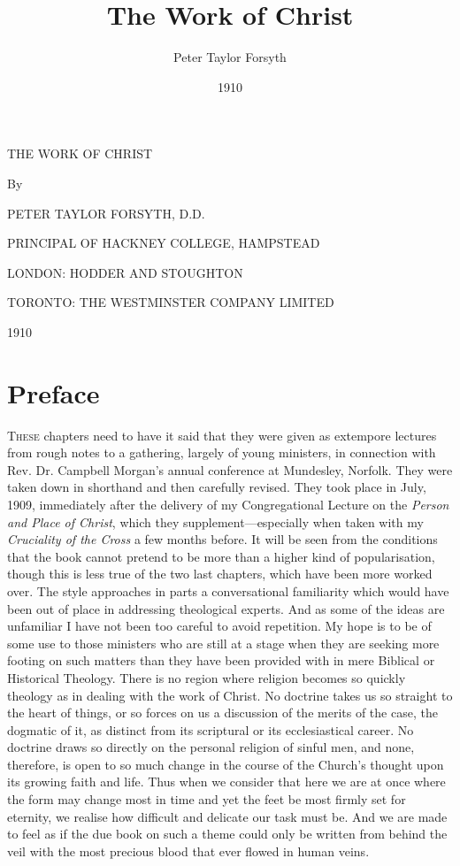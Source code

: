 \documentclass[draft]{ptfdoc}
\author{Peter Taylor Forsyth}
\title{The Work of Christ}
\date{1910}
\begin{document}
\frontmatter

\begin{titlepage}
\centering
{\LARGE THE WORK OF CHRIST \par}
\vspace{2in}
By \\
{\large PETER TAYLOR FORSYTH, D.D. \par}
{\footnotesize PRINCIPAL OF HACKNEY COLLEGE, HAMPSTEAD \par}
\vfill
{\small LONDON: HODDER AND STOUGHTON \par}
{\small TORONTO: THE WESTMINSTER COMPANY LIMITED \par}
1910
\end{titlepage}


\chapter{Preface} 

\textsc{These} chapters need to have it said that 
they were given as extempore lectures 
from rough notes to a gathering, largely of 
young ministers, in connection with Rev. 
Dr. Campbell Morgan's annual conference at 
Mundesley, Norfolk. They were taken down 
in shorthand and then carefully revised. They 
took place in July, 1909, immediately after 
the delivery of my Congregational Lecture on 
the \textit{Person and Place of Christ}, which they 
supplement---especially when taken with my 
\textit{Cruciality of the Cross} a few months before. 
It will be seen from the conditions that the 
book cannot pretend to be more than a 
higher kind of popularisation, though this is 
less true of the two last chapters, which 
have been more worked over. The style approaches 
in parts a conversational familiarity 
which would have been out of place in addressing 
theological experts. And as some of the 
ideas are unfamiliar I have not been too careful 
to avoid repetition. My hope is to be of some 
use to those ministers who are still at a 
stage when they are seeking more footing on 
such matters than they have been provided 
with in mere Biblical or Historical Theology. 
There is no region where religion becomes so 
quickly theology as in dealing with the work 
of Christ. No doctrine takes us so straight 
to the heart of things, or so forces on us a 
discussion of the merits of the case, the dogmatic 
of it, as distinct from its scriptural or 
its ecclesiastical career. No doctrine draws so 
directly on the personal religion of sinful men, 
and none, therefore, is open to so much change 
in the course of the Church's thought upon its 
growing faith and life. Thus when we consider 
that here we are at once where the form may 
change most in time and yet the feet be most 
firmly set for eternity, we realise how difficult 
and delicate our task must be. And we are 
made to feel as if the due book on such a 
theme could only be written from behind the 
veil with the most precious blood that ever 
flowed in human veins. 
\end{document}
